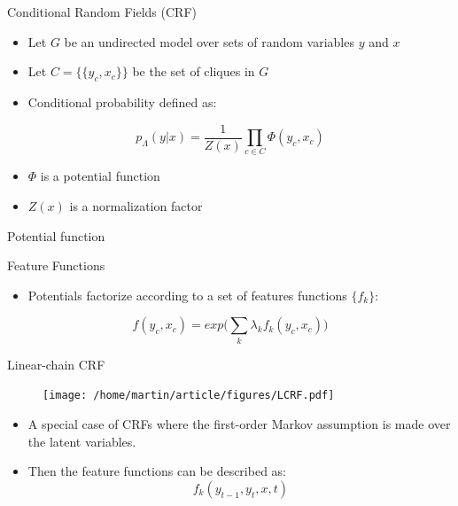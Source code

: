 \documentclass[presentation,bigger]{beamer}
\begin{document}
\begin{frame}[label={sec:orgheadline6}]{Conditional Random Fields (CRF)}
\begin{definition}[CRF]
\begin{itemize}
\item Let \(G\) be an undirected model over sets of random variables \(y\) and \(x\)
\item Let \(C = \{\{y_c, x_c\}\}\) be the set of cliques in \(G\)
\item Conditional probability defined as:
\end{itemize}
\[ p_\Lambda(y|x) = \dfrac{1}{Z(x)}\prod_{c \in C} \Phi (y_c, x_c) \]
\begin{itemize}
\item \(\Phi\) is a potential function
\item \(Z(x)\) is a normalization factor
\end{itemize}
\end{definition}
\end{frame}
\begin{frame}[label={sec:orgheadline7}]{Potential function}
\begin{block}{Feature Functions}
\begin{itemize}
\item Potentials factorize according to a set of features functions \(\{f_k\}\):
\end{itemize}
\[ f(y_c,x_c) = exp\Bigg(\sum_k \lambda_kf_k(y_c,x_c)\Bigg) \]
\end{block}
\end{frame}
\begin{frame}[label={sec:orgheadline8}]{Linear-chain CRF}
\begin{figure}[htb]
\centering
\texttt{[image: /home/martin/article/figures/LCRF.pdf]}
\end{figure}
\begin{itemize}
\item A special case of CRFs where the first-order Markov assumption is made over the latent variables.
\item Then the feature functions can be described as:
\[ f_k(y_{t-1},y_t,x,t) \]
\end{itemize}
\end{frame}
\end{document}
